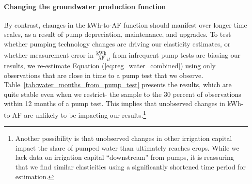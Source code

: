 \paragraph{Changing the groundwater production function}
By contrast, changes in the kWh-to-AF function should manifest over longer time scales, as a result of pump depreciation, maintenance, and upgrades. To test whether pumping technology changes are driving our elasticity estimates, or whether measurement error in $\widehat{\frac{\text{kWh}}{\text{AF}}}_{it}$ from infrequent pump tests are biasing our results, we re-estimate Equation (\ref{eq:reg_water_combined}) using only observations that are close in time to a pump test that we observe. Table~\ref{tab:water_months_from_pump_test} presents the results, which are quite stable even when we restrict- the sample to the 30 percent of observations within 12 months of a pump test. This implies that unobserved changes in kWh-to-AF are unlikely to be impacting our results.\footnote{Another possibility is that unobserved changes in other irrigation capital impact the share of pumped water than ultimately reaches crops. While we lack data on irrigation capital ``downstream'' from pumps, it is reassuring that we find similar elasticities using a significantly shortened time period for estimation.}



